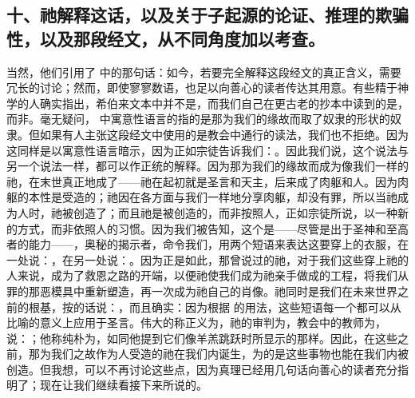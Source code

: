 
\subsection{十、祂解释这话，以及关于子起源的论证、推理的欺骗性，以及那段经文，从不同角度加以考查。}

当然，他们引用了  中的那句话：如今，若要完全解释这段经文的真正含义，需要冗长的讨论；然而，即使寥寥数语，也足以向善心的读者传达其用意。有些精于神学的人确实指出，希伯来文本中并不是，而我们自己在更古老的抄本中读到的是，而非。毫无疑问， 中寓意性语言的指的是那为我们的缘故而取了奴隶的形状的奴隶。但如果有人主张这段经文中使用的是教会中通行的读法，我们也不拒绝。因为这同样是以寓意性语言暗示，因为正如宗徒告诉我们：。因此我们说，这个说法与另一个说法一样，都可以作正统的解释。因为那为我们的缘故而成为像我们一样的祂，在末世真正地成了——祂在起初就是圣言和天主，后来成了肉躯和人。因为肉躯的本性是受造的；祂因在各方面与我们一样地分享肉躯，却没有罪，所以当祂成为人时，祂被创造了；而且祂是被创造的，而非按照人，正如宗徒所说，以一种新的方式，而非依照人的习惯。因为我们被告知，这个是——尽管是出于圣神和至高者的能力——，奥秘的揭示者，命令我们，用两个短语来表达这要穿上的衣服，在一处说：，在另一处说：。因为正是如此，那曾说过的祂，对于我们这些穿上祂的人来说，成为了救恩之路的开端，以便祂使我们成为祂亲手做成的工程，将我们从罪的那恶模具中重新塑造，再一次成为祂自己的肖像。祂同时是我们在未来世界之前的根基，按的话说：，而且确实：因为根据  的用法，这些短语每一个都可以从比喻的意义上应用于圣言。伟大的称正义为，祂的审判为，教会中的教师为，说：；他称纯朴为，如同他提到它们像羊羔跳跃时所显示的那样。因此，在这些之前，那为我们之故作为人受造的祂在我们内诞生，为的是这些事物也能在我们内被创造。但我想，可以不再讨论这些点，因为真理已经用几句话向善心的读者充分指明了；现在让我们继续看接下来所说的。\par

